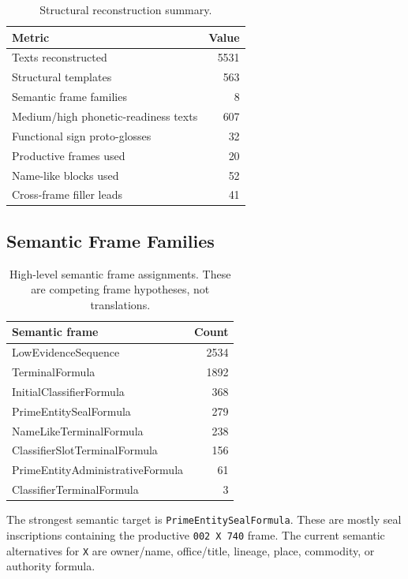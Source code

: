 \begin{table}[htbp]
\centering
\begin{tabular}{lr}
\toprule
\textbf{Metric} & \textbf{Value} \\
\midrule
Texts reconstructed & 5531 \\
Structural templates & 563 \\
Semantic frame families & 8 \\
Medium/high phonetic-readiness texts & 607 \\
Functional sign proto-glosses & 32 \\
Productive frames used & 20 \\
Name-like blocks used & 52 \\
Cross-frame filler leads & 41 \\
\bottomrule
\end{tabular}
\caption{Structural reconstruction summary.}
\label{tab:structural-reconstruction-summary}
\end{table}

\subsection{Semantic Frame Families}

\begin{table}[htbp]
\centering
\begin{tabular}{lr}
\toprule
\textbf{Semantic frame} & \textbf{Count} \\
\midrule
LowEvidenceSequence & 2534 \\
TerminalFormula & 1892 \\
InitialClassifierFormula & 368 \\
PrimeEntitySealFormula & 279 \\
NameLikeTerminalFormula & 238 \\
ClassifierSlotTerminalFormula & 156 \\
PrimeEntityAdministrativeFormula & 61 \\
ClassifierTerminalFormula & 3 \\
\bottomrule
\end{tabular}
\caption{High-level semantic frame assignments. These are competing frame hypotheses, not translations.}
\label{tab:semantic-frame-families}
\end{table}

The strongest semantic target is \texttt{PrimeEntitySealFormula}. These are mostly seal inscriptions containing the productive \texttt{002 X 740} frame. The current semantic alternatives for \texttt{X} are owner/name, office/title, lineage, place, commodity, or authority formula.

